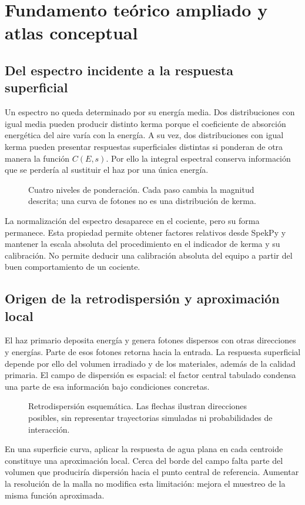 \chapter{Fundamento teórico ampliado y atlas conceptual}
\section{Del espectro incidente a la respuesta superficial}
Un espectro no queda determinado por su energía media. Dos distribuciones con igual media pueden producir distinto kerma porque el coeficiente de absorción energética del aire varía con la energía. A su vez, dos distribuciones con igual kerma pueden presentar respuestas superficiales distintas si ponderan de otra manera la función $C(E,s)$. Por ello la integral espectral conserva información que se perdería al sustituir el haz por una única energía.

\begin{figure}[H]\centering

\caption{Cuatro niveles de ponderación. Cada paso cambia la magnitud descrita; una curva de fotones no es una distribución de kerma.}
\end{figure}
La normalización del espectro desaparece en el cociente, pero su forma permanece. Esta propiedad permite obtener factores relativos desde SpekPy y mantener la escala absoluta del procedimiento en el indicador de kerma y su calibración. No permite deducir una calibración absoluta del equipo a partir del buen comportamiento de un cociente.

\section{Origen de la retrodispersión y aproximación local}
El haz primario deposita energía y genera fotones dispersos con otras direcciones y energías. Parte de esos fotones retorna hacia la entrada. La respuesta superficial depende por ello del volumen irradiado y de los materiales, además de la calidad primaria. El campo de dispersión es espacial: el factor central tabulado condensa una parte de esa información bajo condiciones concretas.
\begin{figure}[H]\centering

\caption{Retrodispersión esquemática. Las flechas ilustran direcciones posibles, sin representar trayectorias simuladas ni probabilidades de interacción.}
\end{figure}
En una superficie curva, aplicar la respuesta de agua plana en cada centroide constituye una aproximación local. Cerca del borde del campo falta parte del volumen que produciría dispersión hacia el punto central de referencia. Aumentar la resolución de la malla no modifica esta limitación: mejora el muestreo de la misma función aproximada.

